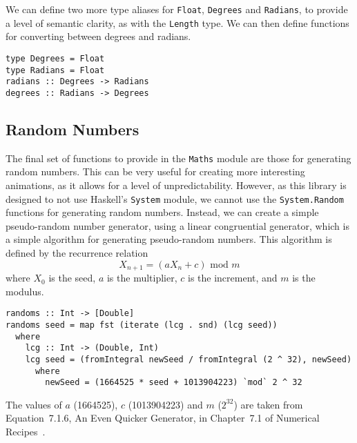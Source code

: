 \documentclass[../main.tex]{subfiles}
\begin{document}
            We can define two more type aliases for \texttt{Float}, \texttt{Degrees} and
                \texttt{Radians}, to provide a level of semantic clarity, as with the
                \texttt{Length} type.
            We can then define functions for converting between degrees and radians.

            \begin{lstlisting}[label={lst:angleFns}, caption={The angle functions.}]  
type Degrees = Float
type Radians = Float                
radians :: Degrees -> Radians
degrees :: Radians -> Degrees\end{lstlisting}

        \subsection{Random Numbers}
            The final set of functions to provide in the \texttt{Maths} module are those
                for generating random numbers.
            This can be very useful for creating more interesting animations, as it allows
                for a level of unpredictability.
            However, as this library is designed to not use Haskell's \texttt{System}
                module, we cannot use the \texttt{System.Random} functions for generating
                random numbers.
            Instead, we can create a simple pseudo-random number generator, using a linear
                congruential generator, which is a simple algorithm for generating
                pseudo-random numbers.
            This algorithm is defined by the recurrence relation $$X_{n+1} = (aX_n + c)
                    \text{ mod } m$$ where $X_0$ is the seed, $a$ is the multiplier, $c$ is the
                increment, and $m$ is the modulus.

            \begin{lstlisting}[label={lst:random}, caption={The random number generator, 
                (\texttt{randoms}) which uses a linear congruential generator to generate an 
                infinite list of pseudo-random numbers, mapped to the range [0, 1].}]
randoms :: Int -> [Double]
randoms seed = map fst (iterate (lcg . snd) (lcg seed))
  where
    lcg :: Int -> (Double, Int)
    lcg seed = (fromIntegral newSeed / fromIntegral (2 ^ 32), newSeed)
      where
        newSeed = (1664525 * seed + 1013904223) `mod` 2 ^ 32\end{lstlisting}

            The values of $a$ (1664525), $c$ (1013904223) and $m$ ($2^32$) are taken from
                Equation~7.1.6, An Even Quicker Generator, in Chapter~7.1 of Numerical
                Recipes~\citep{numericalRecipes}.
\end{document}
